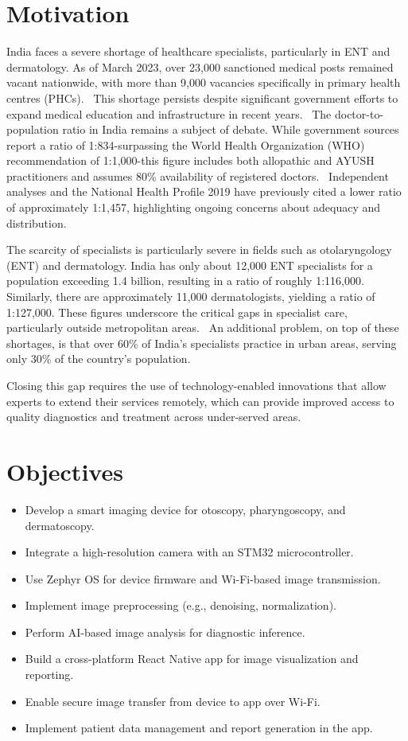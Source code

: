 \section{Motivation}
India faces a severe shortage of healthcare specialists, particularly in ENT and dermatology. As of March 2023, over 23,000 sanctioned medical posts remained vacant nationwide, with more than 9,000 vacancies specifically in primary health centres (PHCs).~\cite{tele} This shortage persists despite significant government efforts to expand medical education and infrastructure in recent years.~\cite{pib} The doctor-to-population ratio in India remains a subject of debate. While government sources report a ratio of 1:834-surpassing the World Health Organization (WHO) recommendation of 1:1,000-this figure includes both allopathic and AYUSH practitioners and assumes 80\% availability of registered doctors.~\cite{pib}\cite{ndtv} Independent analyses and the National Health Profile 2019 have previously cited a lower ratio of approximately 1:1,457, highlighting ongoing concerns about adequacy and distribution.~\cite{swarno} \par
The scarcity of specialists is particularly severe in fields such as otolaryngology (ENT) and dermatology. India has only about 12,000 ENT specialists for a population exceeding 1.4 billion, resulting in a ratio of roughly 1:116,000. Similarly, there are approximately 11,000 dermatologists, yielding a ratio of 1:127,000. These figures underscore the critical gaps in specialist care, particularly outside metropolitan areas.~\cite{dutta}\cite{bw}
An additional problem, on top of these shortages, is that over 60\% of India's specialists practice in urban areas, serving only 30\% of the country's population. \par
Closing this gap requires the use of technology-enabled innovations that allow experts to extend their services remotely, which can provide improved access to quality diagnostics and treatment across under-served areas.

\section{Objectives}
\begin{itemize}
\item Develop a smart imaging device for otoscopy, pharyngoscopy, and dermatoscopy.
\item Integrate a high-resolution camera with an STM32 microcontroller.
\item Use Zephyr OS for device firmware and Wi-Fi-based image transmission.
\item Implement image preprocessing (e.g., denoising, normalization).
\item Perform AI-based image analysis for diagnostic inference.
\item Build a cross-platform React Native app for image visualization and reporting.
\item Enable secure image transfer from device to app over Wi-Fi.
\item Implement patient data management and report generation in the app.
\end{itemize}
